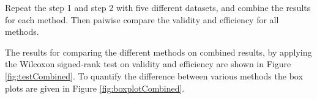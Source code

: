 \documentclass[main]{subfiles}
\begin{document}
Repeat the step 1 and step 2 with five different datasets, and combine the results for each method. Then paiwise compare the validity and efficiency for all methods. %


The results for comparing the different methods on combined results, by applying the Wilcoxon signed-rank test on validity and efficiency are shown in Figure \ref{fig:testCombined}. To quantify the difference between various methods the box plots are given in Figure \ref{fig:boxplotCombined}.
\end{document}
